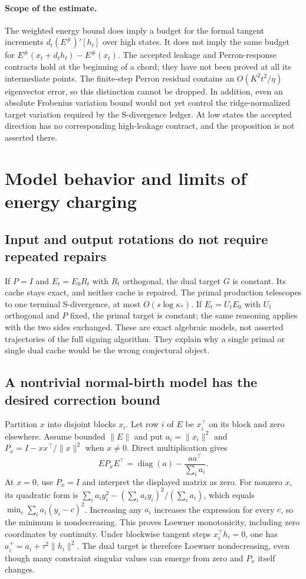 \documentclass[11pt]{amsart}
\theoremstyle{definition}\newtheorem{definition}[theorem]{Definition}
\theoremstyle{remark}\newtheorem{remark}[theorem]{Remark}
\numberwithin{equation}{section}
\newcommand{\diag}{\operatorname{diag}}
\begin{document}
\paragraph{Scope of the estimate.}
The weighted energy bound does imply a budget for the formal tangent
increments $d_t(E^{\#})'[h_t]$ over high states. It does not imply the
same budget for $E^{\#}(x_t+d_th_t)-E^{\#}(x_t)$. The accepted leakage
and Perron-response contracts hold at the beginning of a chord; they
have not been proved at all its intermediate points. The finite-step
Perron residual contains an $O(K^2t^2/\eta)$ eigenvector error, so this
distinction cannot be dropped. In addition, even an absolute Frobenius
variation bound would not yet control the ridge-normalized target
variation required by the S-divergence ledger. At low states the
accepted direction has no corresponding high-leakage contract, and the
proposition is not asserted there.


\section{Model behavior and limits of energy charging}\label{c:models}
\subsection{Input and output rotations do not require repeated repairs}
If $P=I$ and $E_t=E_0R_t$ with $R_t$ orthogonal, the dual target $G$ is
constant. Its cache stays exact, and neither cache is repaired. The primal
production telescopes to one terminal S-divergence, at most
$O(s\log\kappa_*)$. If $E_t=U_tE_0$ with $U_t$ orthogonal and $P$ fixed,
the primal target is constant; the same reasoning applies with the two
sides exchanged. These are exact algebraic models, not asserted
trajectories of the full signing algorithm. They explain why a single
primal or single dual cache would be the wrong conjectural object.

\subsection{A nontrivial normal-birth model has the desired correction bound}
Partition $x$ into disjoint blocks $x_i$. Let row $i$ of $E$ be $x_i^\top$
on its block and zero elsewhere. Assume bounded $\|E\|$ and put $a_i=\|x_i\|^2$ and
$P_x=I-xx^\top/\|x\|^2$ when $x\ne0$. Direct multiplication gives
\begin{equation}\label{c:eq:radial}
 EP_xE^\top=\diag(a)-\frac{aa^\top}{\sum_i a_i}.
\end{equation}
At $x=0$, use $P_x=I$ and interpret the displayed matrix as zero.
For nonzero $x$, its quadratic form is
$\sum_i a_i y_i^2-(\sum_i a_i y_i)^2/(\sum_i a_i)$, which equals
$\min_c\sum_i a_i(y_i-c)^2$. Increasing any $a_i$ increases the
expression for every $c$, so the minimum is nondecreasing. This proves
Loewner monotonicity, including zero coordinates by continuity. Under blockwise tangent steps
$x_i^\top h_i=0$, one has
$a_i^+=a_i+\tau^2\|h_i\|^2$. The dual target is therefore Loewner
nondecreasing, even though many constraint singular values can emerge
from zero and $P_x$ itself changes.
\end{document}
